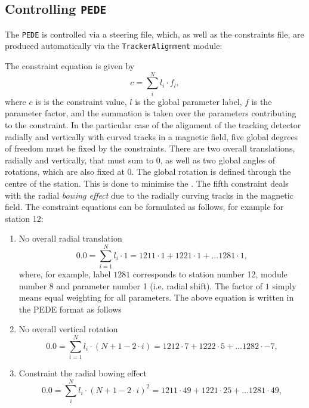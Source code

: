 \documentclass[12pt]{article}
\begin{document}
\subsection{Controlling \texttt{PEDE}} 
The \texttt{PEDE} is controlled via a steering file, which, as well as the constraints file, are produced automatically via the \verb!TrackerAlignment! module:

\clearpage

The constraint equation is given by
\begin{equation}
        c = \sum_i^N l_i\cdot f_l,
\end{equation}
where $c$ is is the constraint value, $l$ is the global parameter label, $f$ is the parameter factor, and the summation is taken over the parameters contributing to the constraint. In the particular case of the alignment of the tracking detector radially and vertically with curved tracks in a magnetic field, five global degrees of freedom must be fixed by the constraints. There are two overall translations, radially and vertically, that must sum to 0, as well as two global angles of rotations, which are also fixed at 0. The global rotation is defined through the centre of the station. This is done to minimise the . The fifth constraint deals with the radial \textit{bowing effect} due to the radially curving tracks in the magnetic field. The constraint equations can be formulated as follows, for example for station 12:
\begin{enumerate}
    \item No overall radial translation
    \begin{equation}
        0.0 = \sum_{i=1}^N l_i\cdot 1 = 1211 \cdot 1 + 1221 \cdot 1 + ... 1281 \cdot 1,
    \end{equation}
    where, for example, label $1281$ corresponds to station number 12, module number 8 and parameter number 1 (i.e. radial shift). The factor of $1$ simply means equal weighting for all parameters. The above equation is written in the PEDE format as follows
    
    \item No overall vertical rotation
    \begin{equation}
        0.0 = \sum_{i=1}^N l_i\cdot (N+1-2\cdot i)  = 1212 \cdot 7 + 1222 \cdot 5 + ... 1282 \cdot -7,
    \end{equation}
    
    \item Constraint the radial bowing effect
     \begin{equation}
        0.0 = \sum_i^N l_i\cdot (N+1-2\cdot i)^2 = 1211 \cdot 49 + 1221 \cdot 25 + ... 1281 \cdot 49, \label{eq:bowing}
    \end{equation}
    
\end{enumerate}
\end{document}
